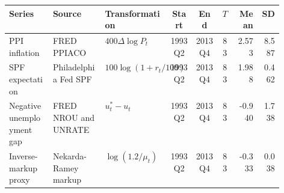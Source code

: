 \begin{tabular}{@{}p{0.16\linewidth}p{0.19\linewidth}p{0.18\linewidth}cccrr@{}}
\toprule
Series & Source & Transformation & Start & End & $T$ & Mean & SD \\
\midrule
PPI inflation & FRED PPIACO & $400\Delta\log P_t$ & 1993Q2 & 2013Q4 & 83 & 2.573 & 8.587 \\
SPF expectation & Philadelphia Fed SPF & $100\log(1+r_t/100)$ & 1993Q2 & 2013Q4 & 83 & 1.988 & 0.462 \\
Negative unemployment gap & FRED NROU and UNRATE & $u_t^*-u_t$ & 1993Q2 & 2013Q4 & 83 & -0.940 & 1.738 \\
Inverse-markup proxy & Nekarda-Ramey markup & $\log(1.2/\mu_t)$ & 1993Q2 & 2013Q4 & 83 & -0.333 & 0.038 \\
\bottomrule
\end{tabular}
